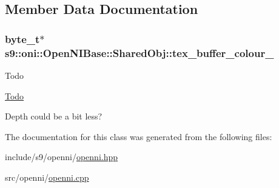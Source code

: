 \subsection{Member Data Documentation}
\hypertarget{classs9_1_1oni_1_1OpenNIBase_1_1SharedObj_a95bcc43c79c432a446a88784ff5d1cc4}{
\subsubsection[{tex\-\_\-buffer\-\_\-colour\-\_\-}]{\setlength{\rightskip}{0pt plus 5cm}byte\-\_\-t$\ast$ s9\-::oni\-::\-Open\-N\-I\-Base\-::\-Shared\-Obj\-::tex\-\_\-buffer\-\_\-colour\-\_\-}}\label{classs9_1_1oni_1_1OpenNIBase_1_1SharedObj_a95bcc43c79c432a446a88784ff5d1cc4}
\begin{DoxyRefDesc}{Todo}
\item[\hyperlink{todo__todo000034}{Todo}]
\begin{DoxyItemize}
\item Depth could be a bit less? 
\end{DoxyItemize}\end{DoxyRefDesc}


The documentation for this class was generated from the following files\-:\begin{DoxyCompactItemize}
\item 
include/s9/openni/\hyperlink{openni_8hpp}{openni.\-hpp}\item 
src/openni/\hyperlink{openni_8cpp}{openni.\-cpp}\end{DoxyCompactItemize}
